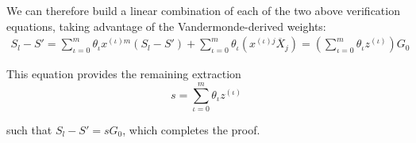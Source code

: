 \begin{appendices}
We can therefore build a linear combination of each of the two above verification equations, taking advantage of the Vandermonde-derived weights:\vspace{.115cm}
\begin{align*}
    S_l - S' = \sum^m_{\iota=0} \theta_{\iota} x^{(\iota)m} (S_l - S') + \sum^m_{\iota=0} \theta_{\iota} \left( x^{(\iota)j} \overline{X}_j \right) = \left( \sum^m_{\iota=0} \theta_{\iota} z^{(\iota)} \right) G_0
\end{align*}

This equation provides the remaining extraction\vspace{.115cm}
\[ s = \sum^m_{\iota=0} \theta_{\iota} z^{(\iota)} \]

such that $S_l - S' = s G_0$, which completes the proof.

\end{appendices}

